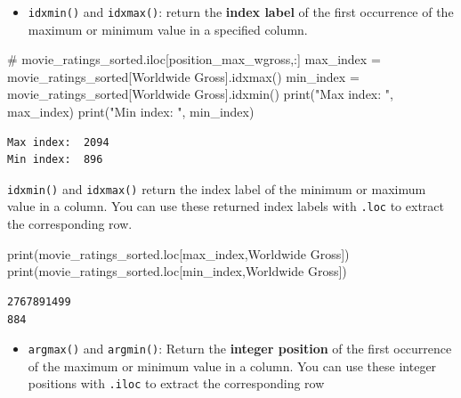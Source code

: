 \documentclass[
  letterpaper,
  DIV=11,
  numbers=noendperiod]{scrreprt}
\newenvironment{Shaded}{\begin{snugshade}}{\end{snugshade}}
\newcommand{\BuiltInTok}[1]{\textcolor[rgb]{0.00,0.23,0.31}{#1}}
\newcommand{\CommentTok}[1]{\textcolor[rgb]{0.37,0.37,0.37}{#1}}
\newcommand{\NormalTok}[1]{\textcolor[rgb]{0.00,0.23,0.31}{#1}}
\newcommand{\OperatorTok}[1]{\textcolor[rgb]{0.37,0.37,0.37}{#1}}
\newcommand{\StringTok}[1]{\textcolor[rgb]{0.13,0.47,0.30}{#1}}
\providecommand{\tightlist}{%
  \setlength{\itemsep}{0pt}\setlength{\parskip}{0pt}}\usepackage{longtable,booktabs,array}
\begin{document}
\begin{itemize}
\tightlist
\item
  \texttt{idxmin()} and \texttt{idxmax()}: return the \textbf{index
  label} of the first occurrence of the maximum or minimum value in a
  specified column.
\end{itemize}

\begin{Shaded}
\begin{Highlighting}[]
\CommentTok{\# movie\_ratings\_sorted.iloc[position\_max\_wgross,:]}
\NormalTok{max\_index }\OperatorTok{=}\NormalTok{ movie\_ratings\_sorted[}\StringTok{\textquotesingle{}Worldwide Gross\textquotesingle{}}\NormalTok{].idxmax()}
\NormalTok{min\_index }\OperatorTok{=}\NormalTok{ movie\_ratings\_sorted[}\StringTok{\textquotesingle{}Worldwide Gross\textquotesingle{}}\NormalTok{].idxmin()}
\BuiltInTok{print}\NormalTok{(}\StringTok{"Max index: "}\NormalTok{, max\_index)}
\BuiltInTok{print}\NormalTok{(}\StringTok{"Min index: "}\NormalTok{, min\_index)}
\end{Highlighting}
\end{Shaded}

\begin{verbatim}
Max index:  2094
Min index:  896
\end{verbatim}

\texttt{idxmin()} and \texttt{idxmax()} return the index label of the
minimum or maximum value in a column. You can use these returned index
labels with \texttt{.loc} to extract the corresponding row.

\begin{Shaded}
\begin{Highlighting}[]
\BuiltInTok{print}\NormalTok{(movie\_ratings\_sorted.loc[max\_index,}\StringTok{\textquotesingle{}Worldwide Gross\textquotesingle{}}\NormalTok{])}
\BuiltInTok{print}\NormalTok{(movie\_ratings\_sorted.loc[min\_index,}\StringTok{\textquotesingle{}Worldwide Gross\textquotesingle{}}\NormalTok{])}
\end{Highlighting}
\end{Shaded}

\begin{verbatim}
2767891499
884
\end{verbatim}

\begin{itemize}
\tightlist
\item
  \texttt{argmax()} and \texttt{argmin()}: Return the \textbf{integer
  position} of the first occurrence of the maximum or minimum value in a
  column. You can use these integer positions with \texttt{.iloc} to
  extract the corresponding row
\end{itemize}
\end{document}
